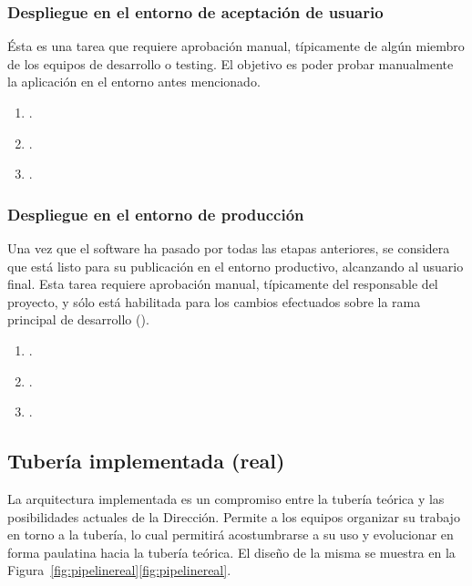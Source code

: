 \subsubsection{Despliegue en el entorno de aceptación de usuario}
%
Ésta es una tarea que requiere aprobación manual, típicamente de algún
miembro de los equipos de desarrollo o testing. El objetivo es poder
probar manualmente la aplicación en el entorno antes mencionado.
%
\begin{enumerate}
\item {}.
\item {}.
\item {}.
\end{enumerate}
%
\subsubsection{Despliegue en el entorno de producción}
%
Una vez que el software ha pasado por todas las etapas anteriores, se
considera que está listo para su publicación en el entorno productivo,
alcanzando al usuario final. Esta tarea requiere aprobación manual,
típicamente del responsable del proyecto, y sólo está habilitada para
los cambios efectuados sobre la rama principal de desarrollo
().
%
\begin{enumerate}
\item {}.
\item {}.
\item {}.
\end{enumerate}
%
\subsection{Tubería implementada (real)}
%
La arquitectura implementada es un compromiso entre la tubería teórica
y las posibilidades actuales de la Dirección. Permite a los equipos
organizar su trabajo en torno a la tubería, lo cual permitirá
acostumbrarse a su uso y evolucionar en forma paulatina hacia la
tubería teórica. El diseño de la misma se muestra en la
\iflatexml{}Figura~\ref{fig:pipelinereal}\else\autoref{fig:pipelinereal}\fi.
